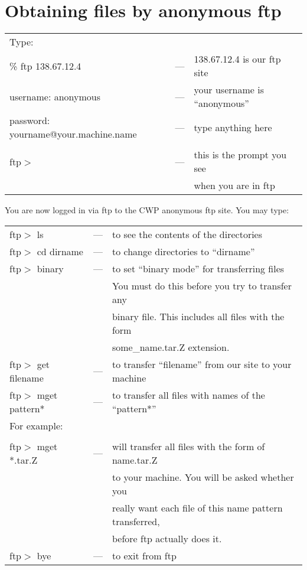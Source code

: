 {{{{{{{\section{Obtaining files by anonymous ftp\label{SU:sec:anonftp}}
\begin{tabular}{lll}
Type: & &  \\
\% ftp 138.67.12.4        & --- &  138.67.12.4 is our ftp site  \\
username: anonymous       & --- &   your username is ``anonymous''     \\
password: yourname@your.machine.name   & --- &  type anything here  \\
& &  \\
ftp$>$     & --- & this is the prompt you see \\
& & when you are in ftp 
\end{tabular}

\indent You are now logged in via ftp to the CWP anonymous ftp site.
You may type:

\begin{tabular}{lll}
ftp$>$ ls             & --- & to see the contents of the directories \\
ftp$>$ cd dirname     & --- & to change directories to ``dirname'' \\
ftp$>$ binary         & --- & to set ``binary mode'' for transferring files \\
        & &            You must do this before you try to transfer any \\
        & &            binary file. This includes all files with the form \\
        & &            some\_name.tar.Z extension. \\
ftp$>$ get filename   & --- & to transfer  ``filename'' from our site to your machine \\
ftp$>$ mget pattern*  & --- & to transfer all files with names of the ``pattern*'' \\
For example: & & \\
&& \\
ftp$>$ mget *.tar.Z   & --- & will transfer all files with the form of name.tar.Z \\
& &              to your machine. You will be asked whether you  \\
& &              really want each file of this name pattern transferred, \\
& &               before ftp actually does it.  \\
ftp$>$ bye            & --- & to exit from ftp 
\end{tabular}

}}}}}}}
